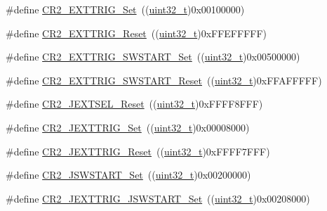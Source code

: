 \begin{DoxyCompactItemize}
\item 
\#define \hyperlink{group___a_d_c___private___defines_gaf39824995dbcbabf76697cd7116352d6}{C\+R2\+\_\+\+E\+X\+T\+T\+R\+I\+G\+\_\+\+Set}~((\hyperlink{_p_e___types_8h_a33594304e786b158f3fb30289278f5af}{uint32\+\_\+t})0x00100000)
\item 
\#define \hyperlink{group___a_d_c___private___defines_ga8a96cb9aac77bab199f3dff54da230a6}{C\+R2\+\_\+\+E\+X\+T\+T\+R\+I\+G\+\_\+\+Reset}~((\hyperlink{_p_e___types_8h_a33594304e786b158f3fb30289278f5af}{uint32\+\_\+t})0x\+F\+F\+E\+F\+F\+F\+F\+F)
\item 
\#define \hyperlink{group___a_d_c___private___defines_gad9bed838631a650428d2318694a66094}{C\+R2\+\_\+\+E\+X\+T\+T\+R\+I\+G\+\_\+\+S\+W\+S\+T\+A\+R\+T\+\_\+\+Set}~((\hyperlink{_p_e___types_8h_a33594304e786b158f3fb30289278f5af}{uint32\+\_\+t})0x00500000)
\item 
\#define \hyperlink{group___a_d_c___private___defines_gad0a6e5cf09868318178434340ade2fe1}{C\+R2\+\_\+\+E\+X\+T\+T\+R\+I\+G\+\_\+\+S\+W\+S\+T\+A\+R\+T\+\_\+\+Reset}~((\hyperlink{_p_e___types_8h_a33594304e786b158f3fb30289278f5af}{uint32\+\_\+t})0x\+F\+F\+A\+F\+F\+F\+F\+F)
\item 
\#define \hyperlink{group___a_d_c___private___defines_gafa78c11893aa39ad2c0117414ae1704d}{C\+R2\+\_\+\+J\+E\+X\+T\+S\+E\+L\+\_\+\+Reset}~((\hyperlink{_p_e___types_8h_a33594304e786b158f3fb30289278f5af}{uint32\+\_\+t})0x\+F\+F\+F\+F8\+F\+F\+F)
\item 
\#define \hyperlink{group___a_d_c___private___defines_ga20a54958799c567e9efaa0635aa18a99}{C\+R2\+\_\+\+J\+E\+X\+T\+T\+R\+I\+G\+\_\+\+Set}~((\hyperlink{_p_e___types_8h_a33594304e786b158f3fb30289278f5af}{uint32\+\_\+t})0x00008000)
\item 
\#define \hyperlink{group___a_d_c___private___defines_ga94404d5a0103c5e2d7ffa45956356931}{C\+R2\+\_\+\+J\+E\+X\+T\+T\+R\+I\+G\+\_\+\+Reset}~((\hyperlink{_p_e___types_8h_a33594304e786b158f3fb30289278f5af}{uint32\+\_\+t})0x\+F\+F\+F\+F7\+F\+F\+F)
\item 
\#define \hyperlink{group___a_d_c___private___defines_ga5292617782f3327f2e1ed0bd9461704e}{C\+R2\+\_\+\+J\+S\+W\+S\+T\+A\+R\+T\+\_\+\+Set}~((\hyperlink{_p_e___types_8h_a33594304e786b158f3fb30289278f5af}{uint32\+\_\+t})0x00200000)
\item 
\#define \hyperlink{group___a_d_c___private___defines_gaac5989ccf10d806f2f6a70f925d6b130}{C\+R2\+\_\+\+J\+E\+X\+T\+T\+R\+I\+G\+\_\+\+J\+S\+W\+S\+T\+A\+R\+T\+\_\+\+Set}~((\hyperlink{_p_e___types_8h_a33594304e786b158f3fb30289278f5af}{uint32\+\_\+t})0x00208000)

\end{DoxyCompactItemize}
